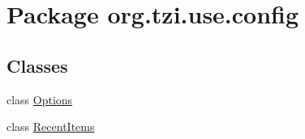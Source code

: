 \hypertarget{namespaceorg_1_1tzi_1_1use_1_1config}{\section{Package org.\-tzi.\-use.\-config}
\label{namespaceorg_1_1tzi_1_1use_1_1config}
}
\subsection*{Classes}
\begin{DoxyCompactItemize}
\item 
class \hyperlink{classorg_1_1tzi_1_1use_1_1config_1_1_options}{Options}
\item 
class \hyperlink{classorg_1_1tzi_1_1use_1_1config_1_1_recent_items}{Recent\-Items}
\end{DoxyCompactItemize}
